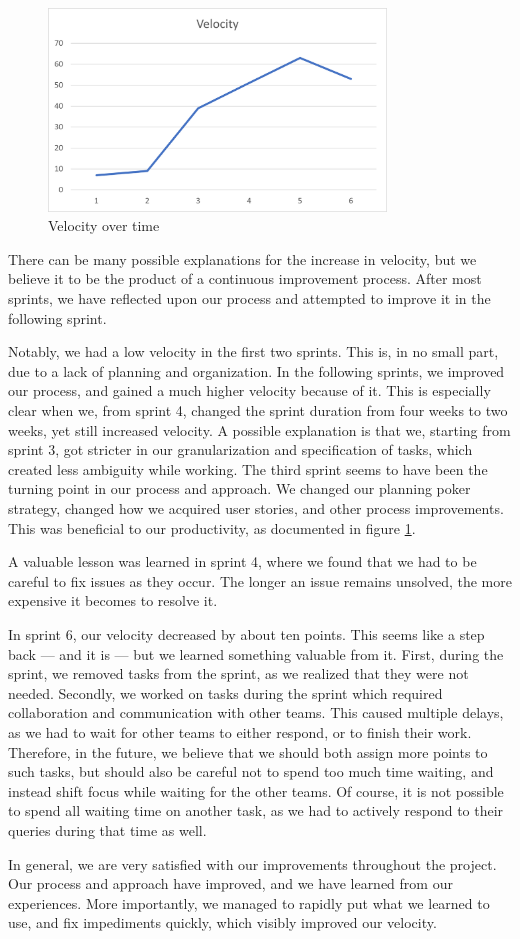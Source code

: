 \begin{figure}[h!]
\centering
\includegraphics[width=0.8\textwidth]{Images/VelocityAnalysis.png}
\caption{Velocity over time}
\label{img:velocityOverTime}
\end{figure}

There can be many possible explanations for the increase in velocity, but we believe it to be the product of a continuous improvement process.
After most sprints, we have reflected upon our process and attempted to improve it in the following sprint.

Notably, we had a low velocity in the first two sprints. This is, in no small part, due to a lack of planning and organization. In the following sprints, we improved our process, and gained a much higher velocity because of it.
This is especially clear when we, from sprint 4, changed the sprint duration from four weeks to two weeks, yet still increased velocity.
A possible explanation is that we, starting from sprint 3, got stricter in our granularization and specification of tasks, which created less ambiguity while working.
The third sprint seems to have been the turning point in our process and approach. We changed our planning poker strategy, changed how we acquired user stories, and other process improvements. This was beneficial to our productivity, as documented in figure \ref{img:velocityOverTime}.

A valuable lesson was learned in sprint 4, where we found that we had to be careful to fix issues as they occur. The longer an issue remains unsolved, the more expensive it becomes to resolve it.

In sprint 6, our velocity decreased by about ten points. This seems like a step back --- and it is --- but we learned something valuable from it.
First, during the sprint, we removed tasks from the sprint, as we realized that they were not needed. 
Secondly, we worked on tasks during the sprint which required collaboration and communication with other teams. This caused multiple delays, as we had to wait for other teams to either respond, or to finish their work. Therefore, in the future, we believe that we should both assign more points to such tasks, but should also be careful not to spend too much time waiting, and instead shift focus while waiting for the other teams. Of course, it is not possible to spend all waiting time on another task, as we had to actively respond to their queries during that time as well.

In general, we are very satisfied with our improvements throughout the project. Our process and approach have improved, and we have learned from our experiences. More importantly, we managed to rapidly put what we learned to use, and fix impediments quickly, which visibly improved our velocity.